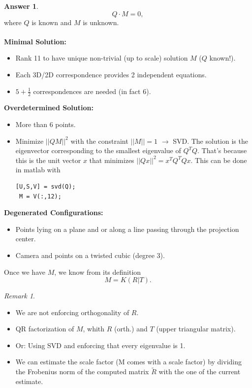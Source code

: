 \documentclass[a4paper,12 pt]{article}
\theoremstyle{definition}
\theoremstyle{remark}
\newtheorem*{bmk}{Remark}
\theoremstyle{definition}
\theoremstyle{definition}
\theoremstyle{definition}
\theoremstyle{definition}
\theoremstyle{remark}
\theoremstyle{remark}
\theoremstyle{definition}
\theoremstyle{definition}
\newtheorem*{answer}{Answer}
\begin{document}
\begin{enumerate}
\begin{enumerate}
\begin{answer}
\begin{equation}
Q\cdot M=0,
\end{equation}
where $Q$ is known and $M$ is unknown. \\ \\
\textbf{Minimal Solution:}
\begin{itemize}
\item Rank 11 to have unique non-trivial (up to scale)  solution $M$ ($Q$ known!).
\item Each 3D/2D correspondence provides 2 independent equations.
\item $5+\frac{1}{2}$ correspondences are needed (in fact 6).
\end{itemize}
\textbf{Overdetermined Solution:}
\begin{itemize}
\item More than 6 points.
\item Minimize $||QM||^2$ with the constraint $||M||=1$ $\rightarrow$ SVD. The solution is the eigenvector corresponding to the smallest eigenvalue of $Q^TQ$. That's because this is the unit vector $x$ that minimizes $||Qx||^2=x^TQ^TQx$. This can be done in matlab with
\begin{verbatim}
[U,S,V] = svd(Q);
 M = V(:,12);
\end{verbatim}

\end{itemize}
\textbf{Degenerated Configurations:}
\begin{itemize}
\item Points lying on a plane and or along a line passing through the projection center.
\item Camera and points on a twisted cubic (degree 3).
\end{itemize}
Once we have $M$, we know from its definition
\begin{equation}
M=K(R|T).
\end{equation}
\begin{bmk}
\
\begin{itemize}
\item We are not enforcing orthogonality of $R$.
\item QR factorization of $M$, whith $R$ (orth.) and $T$ (upper triangular matrix). 
\item Or: Using SVD and enforcing that every eigenvalue is 1.
\item We can estimate the scale factor (M comes with a scale factor) by dividing the Frobenius norm of the computed matrix $\tilde{R}$ with the one of the current estimate.
\end{itemize}
\end{bmk}
\end{answer}

\end{enumerate}
\end{enumerate}
\end{document}

